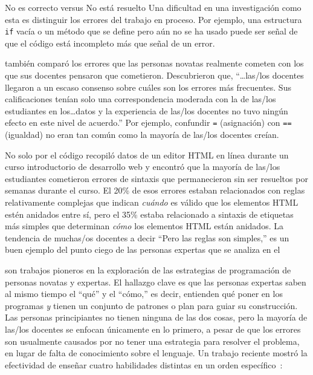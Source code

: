\begin{aside}{No es correcto versus No está resuelto}
  Una dificultad en una investigación como esta es distinguir los errores del trabajo en proceso.
  Por ejemplo,
  una estructura \texttt{if} vacía o un método que se define pero aún no se ha usado
  puede ser señal de que el código está incompleto más que señal de un error.
\end{aside}

\cite{Brow2017} también comparó los errores que las personas novatas realmente cometen
con los que sus docentes pensaron que cometieron.
Descubrieron que,
``{\ldots}las/los docentes llegaron a un escaso consenso sobre cuáles son los errores más frecuentes.
Sus calificaciones tenían solo una correspondencia moderada con la de las/los estudiantes en los{\ldots}datos
y la experiencia de las/los docentes no tuvo ningún efecto en este nivel de acuerdo.''
Por ejemplo,
confundir \texttt{=} (asignación) con \texttt{==} (igualdad)
no eran tan común como la mayoría de las/los docentes creían.

\begin{aside}{No solo por el código}
  \cite{Park2015} recopiló datos de un editor HTML en línea durante un curso introductorio de desarrollo web
  y encontró que la mayoría de las/los estudiantes cometieron errores de sintaxis que permanecieron sin ser resueltos por semanas durante el curso.
  El 20\% de esos errores estaban relacionados con reglas relativamente complejas
  que indican \emph{cuándo} es válido que los elementos HTML estén anidados entre sí,
  pero el 35\% estaba relacionado a sintaxis de etiquetas más simples que determinan \emph{cómo} los elementos HTML están anidados.
  La tendencia de muchas/os docentes a decir
  ``Pero las reglas son simples,''
  es un buen ejemplo del punto ciego de las personas expertas que se analiza en el 
\end{aside}


\cite{Solo1984,Solo1986} son trabajos pioneros en la exploración de las estrategias de programación de personas novatas y expertas.
El hallazgo clave es que las personas expertas saben al mismo tiempo el ``qué'' y el ``cómo,''
es decir, entienden qué poner en los programas
\emph{y} tienen un conjunto de patrones o plan para guiar su construcción.
Las personas principiantes no tienen ninguna de las dos cosas,
pero la mayoría de las/los docentes se enfocan únicamente en lo primero,
a pesar de que los errores son usualmente causados por no tener una estrategia para resolver el problema,
en lugar de falta de conocimiento sobre el lenguaje.
Un trabajo reciente mostró la efectividad de enseñar cuatro habilidades distintas en un orden específico~\cite{Xie2019}:

